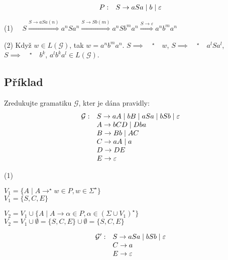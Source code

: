 \[
    \begin{array}{l l}
        P: & S \rightarrow aSa \mid b \mid \varepsilon
    \end{array}
\]

(1) $\quad    S \stackrel{S \rightarrow aSa (n)}{\Longrightarrow} a^nSa^n \stackrel{S \rightarrow Sb (m)}
{\Longrightarrow} a^nSb^ma^n\stackrel{S \rightarrow \varepsilon}{\Longrightarrow} a^n b^m a^n$

(2) \quad Když $w \in L(\mathcal{G})$, tak $w = a^nb^ma^n$. $S \implies \quad^\star \quad w$, 
$S \implies \quad^\star \quad a^lSa^l$, $S \implies \quad^\star \quad  b^k$, 
$a^lb^ka^l \in L(\mathcal{G})$.


\subsection{Příklad} %

Zredukujte gramatiku $\mathcal{G}$, kter je dána pravidly: 
\[
\begin{array}{l l}
    \mathcal{G}: & S \rightarrow aA \mid bB \mid aSa \mid bSb \mid \varepsilon \\
    & A \rightarrow bCD \mid Dba \\
    & B \rightarrow Bb \mid AC \\
    & C \rightarrow aA \mid a \\
    & D \rightarrow DE \\ 
    & E \rightarrow \varepsilon
\end{array}
\]

(1)

$V_1 = \{A \mid A \rightarrow ^\star w \in P, w\in \Sigma ^ \star\}$\\
$V_1 = \{S, C, E\}$

$V_2 = V_1 \cup \{A \mid A \rightarrow \alpha \in P, \alpha \in (\Sigma \cup V_1)^\star\}$\\
$V_2 = V_1 \cup {\emptyset} = \{S, C, E\} \cup {\emptyset} = \{S, C, E\}$

\[
    \begin{array}{l l}
        \mathcal{G'}: & S \rightarrow aSa \mid bSb \mid \varepsilon \\
        & C \rightarrow a \\
        & E \rightarrow \varepsilon
    \end{array}
\]
\vspace*{3mm}

